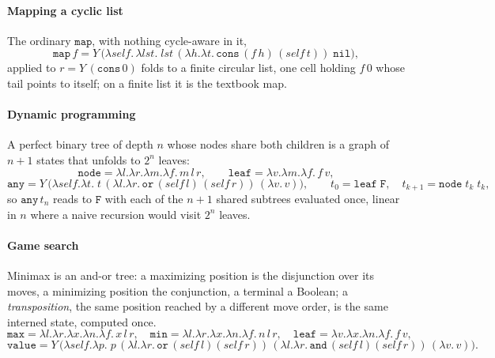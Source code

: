 \paragraph{Mapping a cyclic list}
The ordinary $\mathtt{map}$, with nothing cycle-aware in it,
\[
  \mathtt{map}\,f = Y\,\big(\lambda\mathit{self}.\,\lambda\mathit{lst}.\;
  \mathit{lst}\,(\lambda h.\lambda t.\,\mathtt{cons}\,(f\,h)\,(\mathit{self}\,t))\;\mathtt{nil}\big),
\]
applied to $r = Y\,(\mathtt{cons}\,0)$ folds to a finite circular list, one cell holding $f\,0$ whose tail points to itself; on a finite list it is the textbook map.

\paragraph{Dynamic programming}
A perfect binary tree of depth $n$ whose nodes share both children is a graph of $n+1$ states that unfolds to $2^{n}$ leaves:
\[
  \mathtt{node} = \lambda l.\lambda r.\lambda m.\lambda f.\,m\,l\,r, \qquad
  \mathtt{leaf} = \lambda v.\lambda m.\lambda f.\,f\,v,
\]
\[
  \mathtt{any} = Y\,\big(\lambda\mathit{self}.\lambda t.\;
  t\,(\lambda l.\lambda r.\,\mathtt{or}\,(\mathit{self}\,l)\,(\mathit{self}\,r))\,(\lambda v.\,v)\big),
  \qquad t_0 = \mathtt{leaf}\;\mathtt{F},\quad t_{k+1} = \mathtt{node}\;t_k\;t_k,
\]
so $\mathtt{any}\,t_n$ reads to $\mathtt{F}$ with each of the $n+1$ shared subtrees evaluated once, linear in $n$ where a naive recursion would visit $2^{n}$ leaves.

\paragraph{Game search}
Minimax is an and-or tree: a maximizing position is the disjunction over its moves, a minimizing position the conjunction, a terminal a Boolean; a \emph{transposition}, the same position reached by a different move order, is the same interned state, computed once.
\[
  \mathtt{max} = \lambda l.\lambda r.\lambda x.\lambda n.\lambda f.\,x\,l\,r, \quad
  \mathtt{min} = \lambda l.\lambda r.\lambda x.\lambda n.\lambda f.\,n\,l\,r, \quad
  \mathtt{leaf} = \lambda v.\lambda x.\lambda n.\lambda f.\,f\,v,
\]
\[
  \mathtt{value} = Y\,\big(\lambda\mathit{self}.\lambda p.\;
    p\,(\lambda l.\lambda r.\,\mathtt{or}\,(\mathit{self}\,l)(\mathit{self}\,r))\,
  (\lambda l.\lambda r.\,\mathtt{and}\,(\mathit{self}\,l)(\mathit{self}\,r))\,(\lambda v.\,v)\big).
\]

